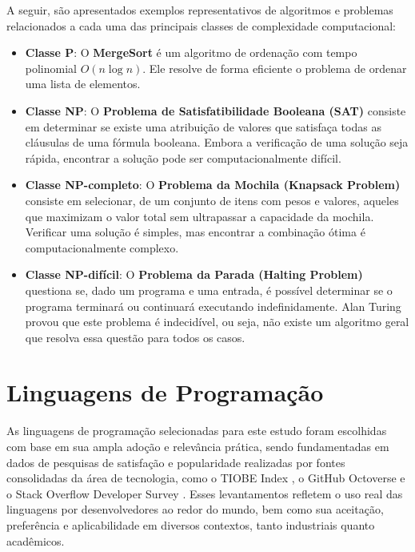 \documentclass[12pt,oneside,a4paper]{report}
\begin{document}
A seguir, são apresentados exemplos representativos de algoritmos e problemas relacionados a cada uma das principais classes de complexidade computacional:

\begin{itemize}
    \item \textbf{Classe P}: O \textbf{MergeSort} é um algoritmo de ordenação com tempo polinomial \(O(n \log n)\). Ele resolve de forma eficiente o problema de ordenar uma lista de elementos.
    
    \item \textbf{Classe NP}: O \textbf{Problema de Satisfatibilidade Booleana (SAT)} consiste em determinar se existe uma atribuição de valores que satisfaça todas as cláusulas de uma fórmula booleana. Embora a verificação de uma solução seja rápida, encontrar a solução pode ser computacionalmente difícil.
    
    \item \textbf{Classe NP-completo}: O \textbf{Problema da Mochila (Knapsack Problem)} consiste em selecionar, de um conjunto de itens com pesos e valores, aqueles que maximizam o valor total sem ultrapassar a capacidade da mochila. Verificar uma solução é simples, mas encontrar a combinação ótima é computacionalmente complexo.
    
    \item \textbf{Classe NP-difícil}: O \textbf{Problema da Parada (Halting Problem)} questiona se, dado um programa e uma entrada, é possível determinar se o programa terminará ou continuará executando indefinidamente. Alan Turing provou que este problema é indecidível, ou seja, não existe um algoritmo geral que resolva essa questão para todos os casos.
\end{itemize}

\section{Linguagens de Programação}

As linguagens de programação selecionadas para este estudo foram escolhidas com base em sua ampla adoção e relevância prática, sendo fundamentadas em dados de pesquisas de satisfação e popularidade realizadas por fontes consolidadas da área de tecnologia, como o TIOBE Index \cite{tiobe}, o GitHub Octoverse \cite{octoverse} e o Stack Overflow Developer Survey \cite{stackoverflow}. Esses levantamentos refletem o uso real das linguagens por desenvolvedores ao redor do mundo, bem como sua aceitação, preferência e aplicabilidade em diversos contextos, tanto industriais quanto acadêmicos.
\end{document}
